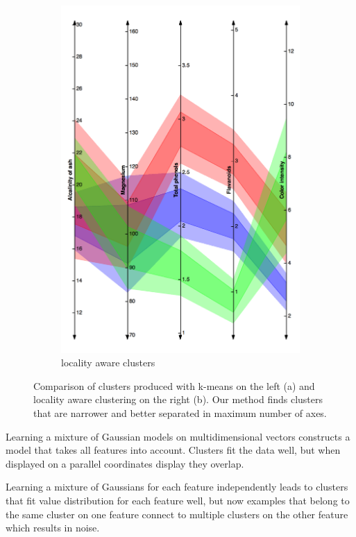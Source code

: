 \documentclass[10pt,a4paper]{article}
\begin{document}
\begin{figure}
\begin{subfigure}[b]{0.45\textwidth}
                \includegraphics[width=\textwidth]{wine-la}
                \caption{locality aware clusters}
                \label{fig:winela}
        \end{subfigure}
        \caption{Comparison of clusters produced with k-means on the left (a) and locality aware clustering on the right (b). Our method finds clusters that are narrower and better separated in maximum number of axes.}\label{fig:animals}
\end{figure}

Learning a mixture of Gaussian models on multidimensional vectors constructs a model that takes all features into account. Clusters fit the data well, but when displayed on a parallel coordinates display they overlap.

Learning a mixture of Gaussians for each feature independently leads to clusters that fit value distribution for each feature well, but now examples that belong to the same cluster on one feature connect to multiple clusters on the other feature which results in noise.
\end{document}
